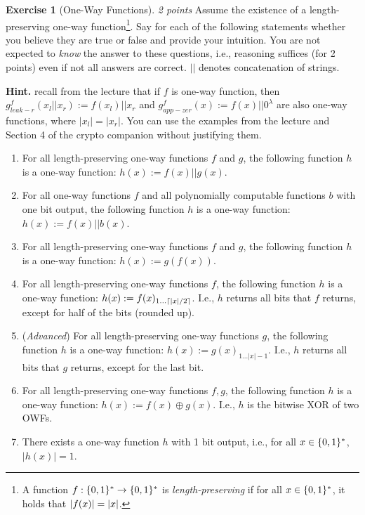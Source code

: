 \documentclass[envcountsame,runningheads,notitlepage]{../llncs}
\theoremstyle{definition}
\newtheorem{graded}[crossed]{Exercise}
\begin{document}
\begin{graded}[One-Way Functions] \emph{2 points}
Assume the existence of a length-preserving one-way function\footnote{A function $f:\{0,1\}^*\rightarrow\{0,1\}^*$ is \emph{length-preserving} if for all $x\in\{0,1\}^*$, it holds that $\left\lvert f(x)\right\rvert=\left\lvert x\right\rvert$.}.
Say for each of the following statements whether you believe they are true or false and provide your intuition. You are not expected to \emph{know} the answer to these questions, i.e., reasoning suffices (for 2 points) even if not all answers are correct. $||$ denotes concatenation of strings.

\medskip
\noindent
\textbf{Hint.} recall from the lecture that if $f$ is one-way function, then $g^f_{leak-r}(x_l||x_r) := f(x_l)||x_r$ and $g^f_{app-zer}(x) := f(x)||0^\lambda$ are also one-way functions, where $|x_l|=|x_r|$. You can use the examples from the lecture and Section 4 of the crypto companion without justifying them.
\begin{enumerate}[label=(\alph*)]
\item \label{itm:f||g} For all length-preserving one-way functions $f$ and $g$, the following function $h$ is a one-way function: $h(x):=f(x)||g(x)$.
\item \label{itm:f||b} For all one-way functions $f$ and all polynomially computable functions $b$ with one bit output, the following function $h$ is a one-way function: $h(x):=f(x)||b(x)$.
\item \label{itm:g(f)} For all length-preserving one-way functions $f$ and $g$, the following function $h$ is a one-way function: $h(x):=g(f(x))$.
\item \label{itm:f no last half} For all length-preserving one-way functions $f$, the following function $h$ is a one-way function: $h(x):=f(x)_{1...\left\lceil|x|/2\right\rceil}$. I.e., $h$ returns all bits that $f$ returns, except for half of the bits (rounded up).
\item \label{itm:f no last bit} (\emph{Advanced}) For all length-preserving one-way functions $g$, the following function $h$ is a one-way function: $h(x):=g(x)_{1...|x|-1}$. I.e., $h$ returns all bits that $g$ returns, except for the last bit.
\item \label{itm:f xor g} For all length-preserving one-way functions $f, g$, the following function $h$ is a one-way function: $h(x):=f(x) \oplus g(x)$. I.e., $h$ is the bitwise XOR of two OWFs.
\item \label{itm:1 bit} There exists a one-way function $h$ with 1 bit output, i.e., for all $x\in\{0,1\}^*$, $|h(x)|=1$.

\end{enumerate}
\end{graded}
\end{document}
